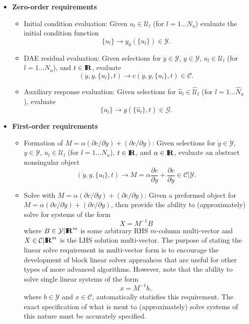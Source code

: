 \documentclass[pdf,ps2pdf,11pt]{SANDreport}
\begin{document}
\begin{itemize}

\item\textbf{Zero-order requirements}

\begin{itemize}
%
{}\item Initial condition evaluation: Given $u_l\in\mathcal{U}_l$ (for
$l=1\ldots{}N_u$) evaluate the initial condition function
\[
\{u_l\} {}\rightarrow y_0(\{u_l\})\in\mathcal{Y}.
\]
%
{}\item DAE residual evaluation: Given selections for $\dot{y}\in\mathcal{Y}$,
$y\in\mathcal{Y}$, $u_l\in\mathcal{U}_l$ (for $l=1\ldots{}N_u$), and
$t\in\mbox{\textbf{I}}\hspace{-0.6ex}\mbox{\textbf{R}}$, evaluate
\[
(\dot{y},y,\{u_l\},t) {}\rightarrow c(\dot{y},y,\{u_l\},t)\in\mathcal{C}.
\]
%
{}\item Auxiliary response evaluation: Given selections for
$\hat{u}_l\in\hat{\mathcal{U}}_l$ (for $l=1\ldots{}\hat{N}_u$), evaluate
\[
\{u_l\} {}\rightarrow g(\{\hat{u}_l\},t)\in\mathcal{G}.
\]
%
\end{itemize}

\item\textbf{First-order requirements}

\begin{itemize}
%
{}\item Formation of $M = {}\alpha ({}\partial c / {}\partial {}\dot{y}) +
({}\partial c / {}\partial y)$: Given selections for $\dot{y}\in\mathcal{Y}$,
$y\in\mathcal{Y}$, $u_l\in\mathcal{U}_l$ (for $l=1\ldots{}N_u$), $t\in\mbox{\textbf{I}}\hspace{-0.6ex}\mbox{\textbf{R}}$,
and $\alpha\in\mbox{\textbf{I}}\hspace{-0.6ex}\mbox{\textbf{R}}$, evaluate an abstract nonsingular object
\[
(\dot{y},y,\{u_l\},t) {}\rightarrow M
= {}\alpha \frac{\partial c}{\partial {}\dot{y}} + \frac{\partial c}{\partial y}
{}\in {}\mathcal{C}|\mathcal{Y}.
\]
%
{}\item Solve with $M = {}\alpha ({}\partial c / {}\partial {}\dot{y}) +
({}\partial c / {}\partial y)$: Given a preformed object for $M = {}\alpha
({}\partial c / {}\partial {}\dot{y}) + ({}\partial c / {}\partial y)$, then
provide the ability to (approximately) solve for systems of the form
\[
X = M^{-1} B
\]
where $B\in\mathcal{Y}|\mbox{\textbf{I}}\hspace{-0.6ex}\mbox{\textbf{R}}^m$ is some arbitrary RHS $m$-column multi-vector
and $X\in\mathcal{C}|\mbox{\textbf{I}}\hspace{-0.6ex}\mbox{\textbf{R}}^m$ is the LHS solution multi-vector.  The purpose of
stating the linear solve requirement in multi-vector form is to encourage the
development of block linear solver approahces that are useful for other types
of more advanced algorithms.  However, note that the ability to solve single
linear systems of the form
\[
x = M^{-1} b,
\]
where $b\in\mathcal{Y}$ and $x\in\mathcal{C}$, automatically statisfies this
requirement.  The exact specification of what is ment to (approximately) solve
systems of this nature must be accurately specified.
%
\end{itemize}

\end{itemize}
\end{document}
